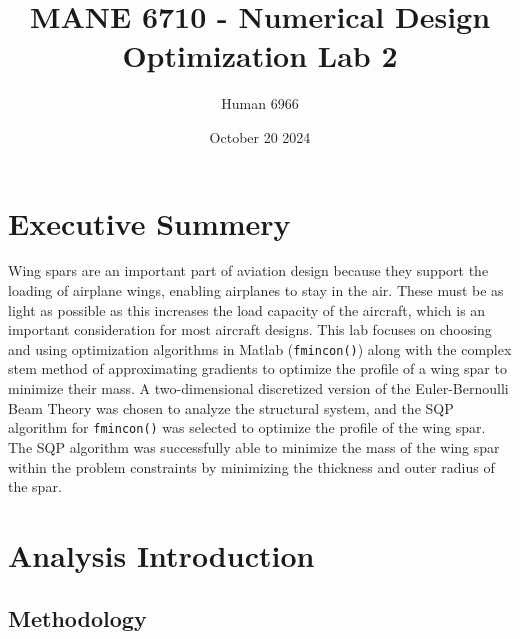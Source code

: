 \documentclass[11pt]{article}%
\title{MANE 6710 - Numerical Design Optimization Lab 2}
\author{Human 6966}
\date{October 20 2024}
\begin{document}
\maketitle
\newpage
\tableofcontents
\newpage
{}
\section*{Executive Summery}
\label{sec:abstract}

Wing spars are an important part of aviation design because they support the loading of airplane wings, enabling airplanes to stay in the air. These must be as light as possible as this increases the load capacity of the aircraft, which is an important consideration for most aircraft designs. This lab focuses on choosing and using optimization algorithms in Matlab (\lstinline{fmincon()}) along with the complex stem method of approximating gradients to optimize the profile of a wing spar to minimize their mass. A two-dimensional discretized version of the Euler-Bernoulli Beam Theory was chosen to analyze the structural system, and the SQP algorithm for \lstinline{fmincon()} was selected to optimize the profile of the wing spar. The SQP algorithm was successfully able to minimize the mass of the wing spar within the problem constraints by minimizing the thickness and outer radius of the spar.

\section{Analysis Introduction}
\label{sec:intro}

\subsection {Methodology}
\label{sec:analysismethod}
\end{document}
